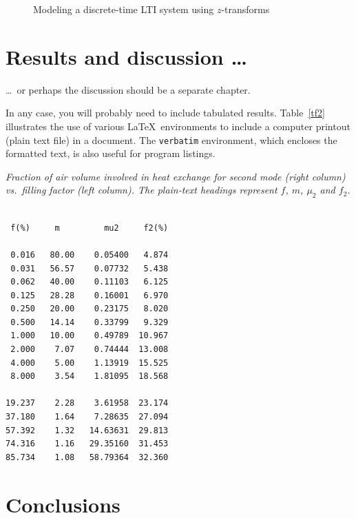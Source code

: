 \documentclass[12pt,openany,a4paper]{book}
\renewcommand{\baselinestretch}{1.2}	%
\newcommand{\tab}[1]  {Table~\ref{#1}}		%
\begin{document}
\begin{figure}[htbp]
\caption{Modeling a discrete-time LTI system using $z$-transforms}
\label{fzsys}
\end{figure}

\chapter{Results and discussion \ldots}

\ldots\ or perhaps the discussion should be a separate chapter.

In any case, you will probably need to include tabulated results.
\tab{tf2} illustrates the use of various \LaTeX\ environments to
include a computer printout (plain text file) in a document.  The
\texttt{verbatim} environment, which encloses the formatted text, is
also useful for program listings.

\begin{table}\renewcommand{\baselinestretch}{1.0}
\caption{\sl Fraction of air volume involved in heat exchange for
second mode (right column) vs.\ filling factor (left column).  The
plain-text headings represent $f$, $m$, $\mu_2$ and $f_2$.}
\label{tf2}

\begin{center}
\begin{minipage}[c]{2.85in}\small\normalsize
\begin{verbatim}

 f(%)     m         mu2     f2(%)

 0.016   80.00    0.05400   4.874
 0.031   56.57    0.07732   5.438
 0.062   40.00    0.11103   6.125
 0.125   28.28    0.16001   6.970
 0.250   20.00    0.23175   8.020
 0.500   14.14    0.33799   9.329
 1.000   10.00    0.49789  10.967
 2.000    7.07    0.74444  13.008
 4.000    5.00    1.13919  15.525
 8.000    3.54    1.81095  18.568

19.237    2.28    3.61958  23.174
37.180    1.64    7.28635  27.094
57.392    1.32   14.63631  29.813
74.316    1.16   29.35160  31.453
85.734    1.08   58.79364  32.360
\end{verbatim}
\end{minipage}
\end{center}
\end{table}

\chapter{Conclusions}
\end{document}
